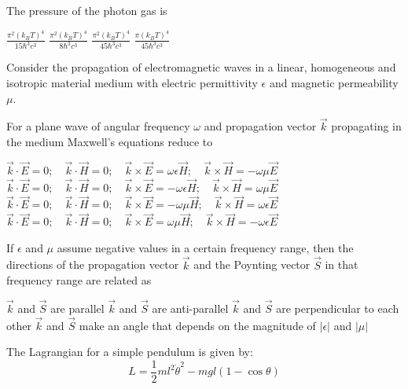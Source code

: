 \documentclass{exam}
\begin{document}
\begin{questions}
\question The pressure of the photon gas is\hfill{}

\begin{oneparchoices}
	\choice $\frac{\pi^2(k_B T)^4}{15 \hbar^3 c^3}$ \choice $\frac{\pi^2(k_B T)^4}{8 \hbar^3 c^3}$
	\choice $\frac{\pi^2(k_B T)^4}{45 \hbar^3 c^3}$ \choice $\frac{\pi(k_B T)^4}{45 \hbar^3 c^3}$
\end{oneparchoices}

\par\noindent Consider the propagation of electromagnetic waves in a linear, homogeneous and isotropic material medium with electric permittivity $\epsilon$ and magnetic permeability $\mu$.

\question For a plane wave of angular frequency $\omega$ and propagation vector $\vec{k}$ propagating in the medium Maxwell's equations reduce to\hfill{}

\begin{choices}
	\choice $\vec{k} \cdot \vec{E} = 0; \quad \vec{k} \cdot \vec{H} = 0; \quad \vec{k} \times \vec{E} = \omega\epsilon\vec{H}; \quad \vec{k} \times \vec{H} = -\omega\mu\vec{E}$
	\choice $\vec{k} \cdot \vec{E} = 0; \quad \vec{k} \cdot \vec{H} = 0; \quad \vec{k} \times \vec{E} = -\omega\epsilon\vec{H}; \quad \vec{k} \times \vec{H} = \omega\mu\vec{E}$
	\choice $\vec{k} \cdot \vec{E} = 0; \quad \vec{k} \cdot \vec{H} = 0; \quad \vec{k} \times \vec{E} = -\omega\mu\vec{H}; \quad \vec{k} \times \vec{H} = \omega\epsilon\vec{E}$
	\choice $\vec{k} \cdot \vec{E} = 0; \quad \vec{k} \cdot \vec{H} = 0; \quad \vec{k} \times \vec{E} = \omega\mu\vec{H}; \quad \vec{k} \times \vec{H} = -\omega\epsilon\vec{E}$
\end{choices}

\question If $\epsilon$ and $\mu$ assume negative values in a certain frequency range, then the directions of the propagation vector $\vec{k}$ and the Poynting vector $\vec{S}$ in that frequency range are related as\hfill{}

\begin{choices}
	\choice $\vec{k}$ and $\vec{S}$ are parallel \choice $\vec{k}$ and $\vec{S}$ are anti-parallel
	\choice $\vec{k}$ and $\vec{S}$ are perpendicular to each other
	\choice $\vec{k}$ and $\vec{S}$ make an angle that depends on the magnitude of $|\epsilon|$ and $|\mu|$
\end{choices}

\par\noindent The Lagrangian for a simple pendulum is given by:
\[ L = \frac{1}{2}ml^2\dot{\theta}^2 - mgl(1-\cos\theta) \]


\end{questions}
\end{document}

